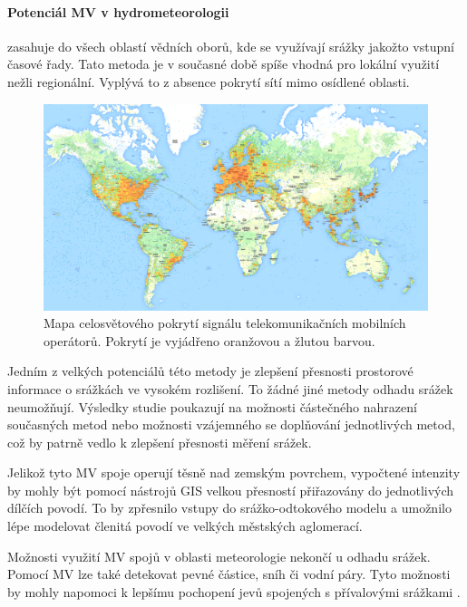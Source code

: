 \documentclass[a4paper,12pt,oneside]{report}
\begin{document}
\paragraph*{Potenciál MV v hydrometeorologii} zasahuje do všech
oblastí vědních oborů, kde se využívají srážky jakožto vstupní časové
řady. Tato metoda je v současné době spíše vhodná pro lokální využití
nežli regionální. Vyplývá to z absence pokrytí sítí mimo osídlené
oblasti.
 \begin{figure}[h!]
    \centering
    \includegraphics[width=1\textwidth]{./img/srazky/opensignalmap.png}
    \caption[Porytí tel. sítí]{\centering Mapa celosvětového pokrytí signálu telekomunikačních mobilních operátorů. Pokrytí je vyjádřeno oranžovou a žlutou barvou. \footnotemark }
    \label{fig:pokryti}
 \end{figure}   

Jedním z velkých potenciálů této metody je zlepšení přesnosti
prostorové informace o srážkách ve vysokém rozlišení. To žádné jiné
metody odhadu srážek neumožňují. Výsledky studie \cite{mv2} poukazují na
možnosti částečného nahrazení současných metod nebo možnosti
vzájemného se doplňování jednotlivých metod, což by patrně vedlo k
zlepšení přesnosti měření srážek.

Jelikož tyto MV spoje operují těsně nad zemským povrchem, vypočtené
intenzity by mohly být pomocí nástrojů \acs{GIS} velkou přesností
přiřazovány do jednotlivých dílčích povodí. To by zpřesnilo vstupy do
srážko-odtokového modelu a umožnilo lépe modelovat členitá povodí ve velkých městských aglomerací.

Možnosti využití MV spojů v oblasti meteorologie nekončí u odhadu
srážek. Pomocí MV lze také detekovat pevné částice, sníh či vodní
páry. Tyto možnosti by mohly napomoci k lepšímu pochopení jevů
spojených s přívalovými srážkami \cite{mv2}.
\end{document}
